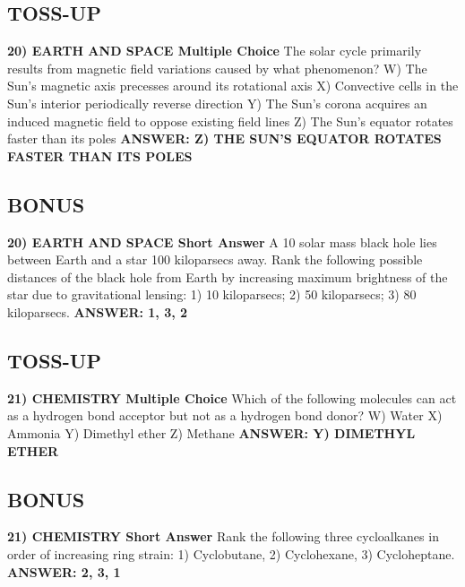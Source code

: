 \documentclass{article}
\begin{document}
\subsection*{TOSS-UP}
\textbf{20) EARTH AND SPACE Multiple Choice} The solar cycle primarily results from magnetic field variations caused by what phenomenon?
\newline
W) The Sun's magnetic axis precesses around its rotational axis
\newline
X) Convective cells in the Sun's interior periodically reverse direction
\newline
Y) The Sun's corona acquires an induced magnetic field to oppose existing field lines
\newline
Z) The Sun's equator rotates faster than its poles
\newline
\textbf{ANSWER: Z) THE SUN'S EQUATOR ROTATES FASTER THAN ITS POLES}

\subsection*{BONUS}
\textbf{20) EARTH AND SPACE Short Answer} A 10 solar mass black hole lies between Earth and a star 100 kiloparsecs away. Rank the following possible distances of the black hole from Earth by increasing maximum brightness of the star due to gravitational lensing: 1) 10 kiloparsecs; 2) 50 kiloparsecs; 3) 80 kiloparsecs.
\newline
\textbf{ANSWER: 1, 3, 2}

\subsection*{TOSS-UP}
\textbf{21) CHEMISTRY Multiple Choice} Which of the following molecules can act as a hydrogen bond acceptor but not as a hydrogen bond donor?
\newline
W) Water
\newline
X) Ammonia
\newline
Y) Dimethyl ether
\newline
Z) Methane
\newline
\textbf{ANSWER: Y) DIMETHYL ETHER}

\subsection*{BONUS}
\textbf{21) CHEMISTRY Short Answer} Rank the following three cycloalkanes in order of increasing ring strain: 1) Cyclobutane, 2) Cyclohexane, 3) Cycloheptane.
\newline
\textbf{ANSWER: 2, 3, 1}
\end{document}
